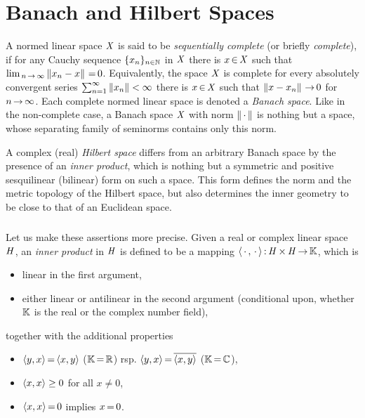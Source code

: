 \documentclass[11pt,twoside]{article}
\begin{document}
\section{Banach and Hilbert Spaces}
A normed linear space $\mathit{X}$ is said to be \textit{sequentially complete}
(or briefly \textit{complete}),
if for any Cauchy sequence $\{x_n\}_{n \in {\mathbb{N}}}$ in $\mathit{X}$
there is $x {\,\in\,} \mathit{X}$
such that $\lim_{\,n {\,\to\,} \infty} \left\lVert x_n-x \right\rVert {\,=\,} 0$.
Equivalently,
the space $\mathit{X}$ is complete
\iff
for every absolutely convergent series
$\sum_{n=1}^{\infty} \left\lVert x_n \right\rVert < \infty$ there is $x {\,\in\,} \mathit{X}$
such that $\left\lVert x-x_n \right\rVert {\,\to\,} 0$ for $n {\,\to\,} \infty$.
Each complete normed linear space is denoted a \textit{Banach space}.
Like in the non-complete case,
a Banach space $\mathit{X}$ with norm $\left\lVert \,\cdot\, \right\rVert$
is nothing but a {\FRECHET} space,
whose separating family of seminorms contains only this norm.

A complex (real) \textit{Hilbert space} differs
from an arbitrary Banach space by the presence of an \textit{inner product},
which is nothing but a symmetric and positive sesquilinear (bilinear) form
on such a space.
This form defines the norm and the metric topology of the Hilbert space,
but also determines the inner geometry to be close
to that of an Euclidean space.

\subparagraph{} %
Let us make these assertions more precise.
Given a real or complex linear space $\mathit{H}$,
an \textit{inner product} in $\mathit{H}$ is defined to be a mapping
$\langle \,\cdot\,,\,\cdot\, \rangle{\,:\,} \mathit{H} {\,\times\,} \mathit{H} {\,\to\,} {\mathbb{K}}$,
which is

\begin{itemize}[leftmargin=35pt]
\item[(I-1)]
linear in the first argument,

\item[(I-2)]
either linear or antilinear in the second argument (conditional upon,
whether ${\mathbb{K}}$ is the real or the complex number field),
\end{itemize}

together with the additional properties

\begin{itemize}[leftmargin=35pt]
\item[(I-3)]
$\langle y,x \rangle {\,=\,}           \langle x,y \rangle$  (${\mathbb{K}} {\,=\,} {\mathbb{R}}$) rsp.
$\langle y,x \rangle {\,=\,} \overline{\langle x,y \rangle}$ (${\mathbb{K}} {\,=\,} {\mathbb{C}}$),
\item[(I-4)]
$\langle x,x \rangle \geq 0$ for all $x \neq 0$,
\item[(I-5)]
$\langle x,x \rangle {\,=\,} 0$ implies $x {\,=\,} 0$.
\end{itemize}
\end{document}
